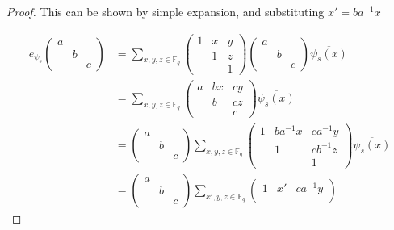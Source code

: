 \documentclass[12pt,reqno]{amsart}
\theoremstyle{definition}
\theoremstyle{remark}
\numberwithin{equation}{section}
\begin{document}
\begin{proof}
    This can be shown by simple expansion, and substituting $x' = ba^{-1}x$

    \begin{align*}
        e_{\psi_s} \begin{pmatrix}
            a & &\\
            & b &\\
            & & c
        \end{pmatrix} &= 
        \sum_{x, y, z \in \mathbb{F}_q}
        \begin{pmatrix}
            1 & x & y\\
            & 1 & z\\
            & & 1
        \end{pmatrix}
        \begin{pmatrix}
            a & & \\
            & b & \\
            & & c
        \end{pmatrix}
        \overline{\psi_s(x)}\\
        &= \sum_{x, y, z \in \mathbb{F}_q}\begin{pmatrix}
            a & bx & cy\\
            & b & cz\\
            & & c
        \end{pmatrix} \overline{\psi_s(x)}\\
        &= \begin{pmatrix}
            a & & \\
            & b &\\
            & & c
        \end{pmatrix} \sum_{x, y, z \in \mathbb{F}_q}
        \begin{pmatrix}
            1 & ba^{-1}x & ca^{-1}y\\
            & 1 & cb^{-1}z\\
            & & 1
        \end{pmatrix} \overline{\psi_s(x)}\\
        &= \begin{pmatrix}
            a & & \\
            & b &\\
            & & c
        \end{pmatrix} \sum_{x', y, z \in \mathbb{F}_q}
        \begin{pmatrix}
            1 & x' & ca^{-1}y\\

\end{pmatrix}
\end{align*}
\end{proof}
\end{document}
